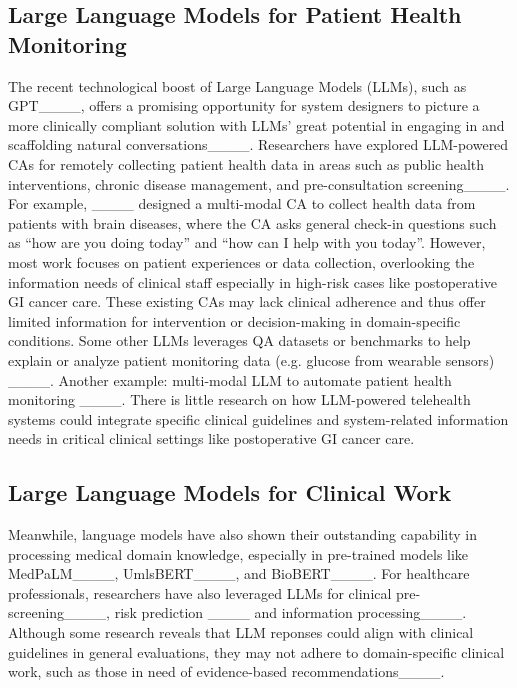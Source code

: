 \subsection{Large Language Models for Patient Health Monitoring}
\label{sub:related_work-3}
The recent technological boost of Large Language Models (LLMs), such as GPT____, offers a promising opportunity for system designers to picture a more clinically compliant solution with LLMs' great potential in engaging in and scaffolding natural conversations____. 
Researchers have explored LLM-powered CAs for remotely collecting patient health data in areas such as public health interventions, chronic disease management, and pre-consultation screening____. For example, ____  designed a multi-modal CA to collect health data from patients with brain diseases, where the CA asks general check-in questions such as ``how are you doing today'' and ``how can I help with you today''. 
However, most work focuses on patient experiences or data collection, overlooking the information needs of clinical staff especially in high-risk cases like postoperative GI cancer care. These existing CAs may lack clinical adherence and thus offer limited information for intervention or decision-making in domain-specific conditions. 
Some other LLMs leverages QA datasets or benchmarks to help explain or analyze patient monitoring data (e.g. glucose from wearable sensors) ____. Another example: multi-modal LLM to automate patient health monitoring ____.
There is little research on how LLM-powered telehealth systems could integrate specific clinical guidelines and system-related information needs in critical clinical settings like postoperative GI cancer care.

\subsection{Large Language Models for Clinical Work}
Meanwhile, language models have also shown their outstanding capability in processing medical domain knowledge, especially in pre-trained models like MedPaLM____, UmlsBERT____, and BioBERT____. For healthcare professionals, researchers have also leveraged LLMs for clinical pre-screening____, risk prediction ____ and information processing____. 
Although some research reveals that LLM reponses could align with clinical guidelines in general evaluations, they may not adhere to domain-specific clinical work, such as those in need of evidence-based recommendations____.


